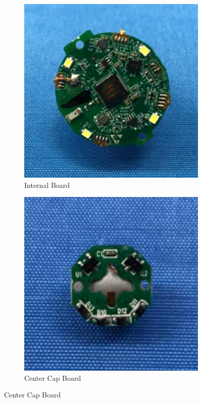\begin{figure}[h]
    \centering
    \caption{The internal components of the Go Cube \cite{gocube-internals}}
    \label{fig:gocube-internal-components}
    \begin{subfigure}{0.25\textwidth}
        \centering
        \caption{Internal Board}
        \label{fig:gocube-core}
        \includegraphics[width=.90\linewidth]{Figures/3 State of the Art/gocube-core.png}
    \end{subfigure}%
    \begin{subfigure}{0.25\textwidth}
        \centering
        \caption{Center Cap Board}
        \label{fig:gocube-cap-chip}
        \includegraphics[width=.90\linewidth]{Figures/3 State of the Art/gocube-cap-chip.png}

\end{subfigure}
\end{figure}

